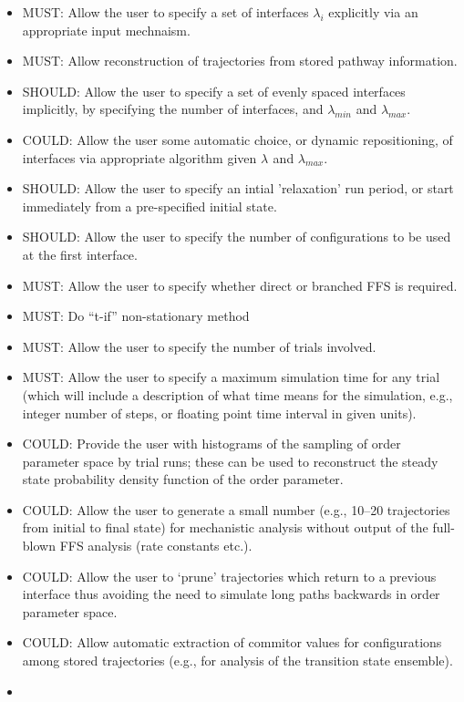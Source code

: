 \documentclass[11pt]{article}
\begin{document}
\begin{itemize}
\item
MUST: Allow the user to specify a set of interfaces $\lambda_i$ explicitly
via an appropriate input mechnaism.
\item
MUST: Allow reconstruction of trajectories from stored pathway information.
\item
SHOULD: Allow the user to specify a set of evenly spaced interfaces
implicitly, by specifying the number of interfaces, and $\lambda_{min}$
and $\lambda_{max}$.
\item
COULD: Allow the user some automatic choice, or dynamic repositioning, of
interfaces via appropriate algorithm given $\lambda_{}$ and $\lambda_{max}$.
\item
SHOULD: Allow the user to specify an intial 'relaxation' run period, or
start immediately from a pre-specified initial state.
\item
SHOULD: Allow the user to specify the number of configurations to be used
at the first interface.
\item
MUST: Allow the user to specify whether direct or branched FFS is required.
\item
MUST: Do ``t-if'' non-stationary method
\item
MUST: Allow the user to specify the number of trials involved.
\item
MUST: Allow the user to specify a maximum simulation time for any trial
(which will include a description of what time means for the simulation,
e.g., integer number of steps, or floating point time interval in given
units).
\item
COULD: Provide the user with histograms of the sampling of order parameter
space by trial runs; these can be used to reconstruct the steady state
probability density function of the order parameter. %
\item
COULD: Allow the user to generate a small number (e.g., 10--20 trajectories
from initial to final state) for mechanistic analysis without output of the
full-blown FFS analysis (rate constants etc.).
\item
COULD: Allow the user to `prune' trajectories which return to a previous
interface thus avoiding the need to simulate long paths backwards in
order parameter space. %
\item
COULD: Allow automatic extraction of commitor values for configurations
among stored trajectories (e.g., for analysis of the transition state
ensemble).
\item

\end{itemize}
\end{document}
